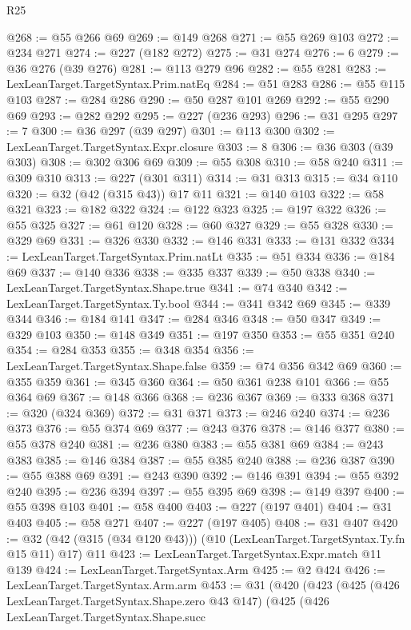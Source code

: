 \begin{lexlean}{R25}
\begin{coremodule}
@268 := @55 @266 @69
@269 := @149 @268
@271 := @55 @269 @103
@272 := @234 @271
@274 := @227 (@182 @272)
@275 := @31 @274
@276 := 6
@279 := @36 @276 (@39 @276)
@281 := @113 @279 @96
@282 := @55 @281
@283 := LexLeanTarget.TargetSyntax.Prim.natEq
@284 := @51 @283
@286 := @55 @115 @103
@287 := @284 @286
@290 := @50 @287 @101 @269
@292 := @55 @290 @69
@293 := @282 @292
@295 := @227 (@236 @293)
@296 := @31 @295
@297 := 7
@300 := @36 @297 (@39 @297)
@301 := @113 @300
@302 := LexLeanTarget.TargetSyntax.Expr.closure
@303 := 8
@306 := @36 @303 (@39 @303)
@308 := @302 @306 @69
@309 := @55 @308
@310 := @58 @240
@311 := @309 @310
@313 := @227 (@301 @311)
@314 := @31 @313
@315 := @34 @110
@320 := @32 (@42 (@315 @43)) @17 @11
@321 := @140 @103
@322 := @58 @321
@323 := @182 @322
@324 := @122 @323
@325 := @197 @322
@326 := @55 @325
@327 := @61 @120
@328 := @60 @327
@329 := @55 @328
@330 := @329 @69
@331 := @326 @330
@332 := @146 @331
@333 := @131 @332
@334 := LexLeanTarget.TargetSyntax.Prim.natLt
@335 := @51 @334
@336 := @184 @69
@337 := @140 @336
@338 := @335 @337
@339 := @50 @338
@340 := LexLeanTarget.TargetSyntax.Shape.true
@341 := @74 @340
@342 := LexLeanTarget.TargetSyntax.Ty.bool
@344 := @341 @342 @69
@345 := @339 @344
@346 := @184 @141
@347 := @284 @346
@348 := @50 @347
@349 := @329 @103
@350 := @148 @349
@351 := @197 @350
@353 := @55 @351 @240
@354 := @284 @353
@355 := @348 @354
@356 := LexLeanTarget.TargetSyntax.Shape.false
@359 := @74 @356 @342 @69
@360 := @355 @359
@361 := @345 @360
@364 := @50 @361 @238 @101
@366 := @55 @364 @69
@367 := @148 @366
@368 := @236 @367
@369 := @333 @368
@371 := @320 (@324 @369)
@372 := @31 @371
@373 := @246 @240
@374 := @236 @373
@376 := @55 @374 @69
@377 := @243 @376
@378 := @146 @377
@380 := @55 @378 @240
@381 := @236 @380
@383 := @55 @381 @69
@384 := @243 @383
@385 := @146 @384
@387 := @55 @385 @240
@388 := @236 @387
@390 := @55 @388 @69
@391 := @243 @390
@392 := @146 @391
@394 := @55 @392 @240
@395 := @236 @394
@397 := @55 @395 @69
@398 := @149 @397
@400 := @55 @398 @103
@401 := @58 @400
@403 := @227 (@197 @401)
@404 := @31 @403
@405 := @58 @271
@407 := @227 (@197 @405)
@408 := @31 @407
@420 := @32 (@42 (@315 (@34 @120 @43))) (@10 (LexLeanTarget.TargetSyntax.Ty.fn @15 @11) @17) @11
@423 := LexLeanTarget.TargetSyntax.Expr.match @11 @139
@424 := LexLeanTarget.TargetSyntax.Arm
@425 := @2 @424
@426 := LexLeanTarget.TargetSyntax.Arm.arm
@453 := @31
    (@420
      (@423
        (@425
          (@426 LexLeanTarget.TargetSyntax.Shape.zero @43 @147)
          (@425
            (@426
              LexLeanTarget.TargetSyntax.Shape.succ

\end{coremodule}
\end{lexlean}
